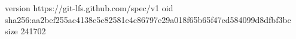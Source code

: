 version https://git-lfs.github.com/spec/v1
oid sha256:aa2bef255ac4138e5c82581e4c86797e29a018f65b65f47ed584099d8dfbf3bc
size 241702

